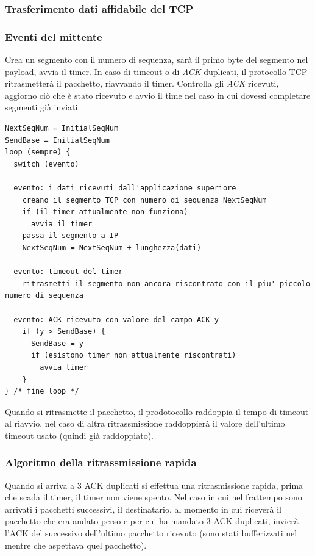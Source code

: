 \subsubsection{Trasferimento dati affidabile del TCP}
\subsubsection*{Eventi del mittente}
Crea un segmento con il numero di sequenza, sarà il primo byte del segmento nel payload, avvia il timer.
In caso di timeout o di \textit{ACK} duplicati, il protocollo TCP ritrasmetterà il pacchetto, riavvando il timer.
Controlla gli \textit{ACK} ricevuti, aggiorno ciò che è stato ricevuto e avvio il time nel caso in cui dovessi completare segmenti già inviati. 

\begin{lstlisting}
NextSeqNum = InitialSeqNum
SendBase = InitialSeqNum
loop (sempre) {
  switch (evento)

  evento: i dati ricevuti dall'applicazione superiore
    creano il segmento TCP con numero di sequenza NextSeqNum
    if (il timer attualmente non funziona)
      avvia il timer
    passa il segmento a IP
    NextSeqNum = NextSeqNum + lunghezza(dati)

  evento: timeout del timer
    ritrasmetti il segmento non ancora riscontrato con il piu' piccolo numero di sequenza
  
  evento: ACK ricevuto con valore del campo ACK y
    if (y > SendBase) {
      SendBase = y
      if (esistono timer non attualmente riscontrati)
        avvia timer
    }
} /* fine loop */
\end{lstlisting}
Quando si ritrasmette il pacchetto, il prodotocollo raddoppia il tempo di timeout al riavvio, nel caso di altra ritrassmissione raddoppierà il valore dell'ultimo timeout usato (quindi già raddoppiato).

\subsubsection*{Algoritmo della ritrassmissione rapida}
Quando si arriva a 3 ACK duplicati si effettua una ritrasmissione rapida, prima che scada il timer, il timer non viene spento.
Nel caso in cui nel frattempo sono arrivati i pacchetti successivi, il destinatario, al momento in cui riceverà il pacchetto che era andato perso e per cui ha mandato 3 ACK duplicati, invierà l'ACK del successivo dell'ultimo pacchetto ricevuto (sono stati bufferizzati nel mentre che aspettava quel pacchetto). 


